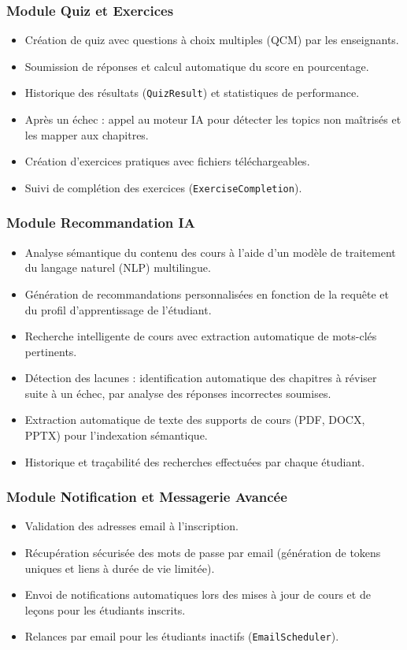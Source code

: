 \documentclass[12pt,a4paper]{report}
\begin{document}
\subsubsection{Module Quiz et Exercices}
\begin{itemize}[leftmargin=*]
  \item Création de quiz avec questions à choix multiples (QCM) par les enseignants.
  \item Soumission de réponses et calcul automatique du score en pourcentage.
  \item Historique des résultats (\texttt{QuizResult}) et statistiques de performance.
  \item Après un échec : appel au moteur IA pour détecter les topics non maîtrisés et les mapper aux chapitres.
  \item Création d'exercices pratiques avec fichiers téléchargeables.
  \item Suivi de complétion des exercices (\texttt{ExerciseCompletion}).
\end{itemize}

\subsubsection{Module Recommandation IA}
\begin{itemize}[leftmargin=*]
  \item Analyse sémantique du contenu des cours à l'aide d'un modèle de traitement du langage naturel (NLP) multilingue.
  \item Génération de recommandations personnalisées en fonction de la requête et du profil d'apprentissage de l'étudiant.
  \item Recherche intelligente de cours avec extraction automatique de mots-clés pertinents.
  \item Détection des lacunes : identification automatique des chapitres à réviser suite à un échec, par analyse des réponses incorrectes soumises.
  \item Extraction automatique de texte des supports de cours (PDF, DOCX, PPTX) pour l'indexation sémantique.
  \item Historique et traçabilité des recherches effectuées par chaque étudiant.
\end{itemize}

\subsubsection{Module Notification et Messagerie Avancée}
\begin{itemize}[leftmargin=*]
  \item Validation des adresses email à l'inscription.
  \item Récupération sécurisée des mots de passe par email (génération de tokens uniques et liens à durée de vie limitée).
  \item Envoi de notifications automatiques lors des mises à jour de cours et de leçons pour les étudiants inscrits.
  \item Relances par email pour les étudiants inactifs (\texttt{EmailScheduler}).
\end{itemize}
\end{document}
